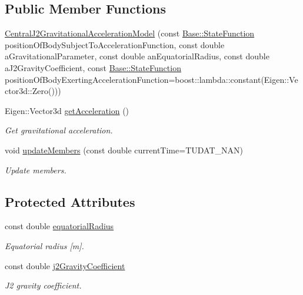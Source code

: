 \subsection*{Public Member Functions}
\begin{DoxyCompactItemize}
\item 
\hyperlink{classtudat_1_1gravitation_1_1CentralJ2GravitationalAccelerationModel_a2d2767dc4bf74c60d61aee004aefeaef}{Central\+J2\+Gravitational\+Acceleration\+Model} (const \hyperlink{classtudat_1_1gravitation_1_1SphericalHarmonicsGravitationalAccelerationModelBase_a4ca706c4f941be481fc5f490e49390d8}{Base\+::\+State\+Function} position\+Of\+Body\+Subject\+To\+Acceleration\+Function, const double a\+Gravitational\+Parameter, const double an\+Equatorial\+Radius, const double a\+J2\+Gravity\+Coefficient, const \hyperlink{classtudat_1_1gravitation_1_1SphericalHarmonicsGravitationalAccelerationModelBase_a4ca706c4f941be481fc5f490e49390d8}{Base\+::\+State\+Function} position\+Of\+Body\+Exerting\+Acceleration\+Function=boost\+::lambda\+::constant(Eigen\+::\+Vector3d\+::\+Zero()))
\item 
Eigen\+::\+Vector3d \hyperlink{classtudat_1_1gravitation_1_1CentralJ2GravitationalAccelerationModel_abd75fb71f44ab8dd56edfcf9458c78eb}{get\+Acceleration} ()
\begin{DoxyCompactList}\small\item\em Get gravitational acceleration. \end{DoxyCompactList}\item 
void \hyperlink{classtudat_1_1gravitation_1_1CentralJ2GravitationalAccelerationModel_a29a5ea148a2db77b0f16809c699d480a}{update\+Members} (const double current\+Time=T\+U\+D\+A\+T\+\_\+\+N\+AN)
\begin{DoxyCompactList}\small\item\em Update members. \end{DoxyCompactList}\end{DoxyCompactItemize}
\subsection*{Protected Attributes}
\begin{DoxyCompactItemize}
\item 
const double \hyperlink{classtudat_1_1gravitation_1_1CentralJ2GravitationalAccelerationModel_a6d026fff91793df3c8160e9f3fc07c1e}{equatorial\+Radius}
\begin{DoxyCompactList}\small\item\em Equatorial radius \mbox{[}m\mbox{]}. \end{DoxyCompactList}\item 
const double \hyperlink{classtudat_1_1gravitation_1_1CentralJ2GravitationalAccelerationModel_a7197466bf1fd2bb185ebfef5660b1d57}{j2\+Gravity\+Coefficient}
\begin{DoxyCompactList}\small\item\em J2 gravity coefficient. \end{DoxyCompactList}\end{DoxyCompactItemize}
